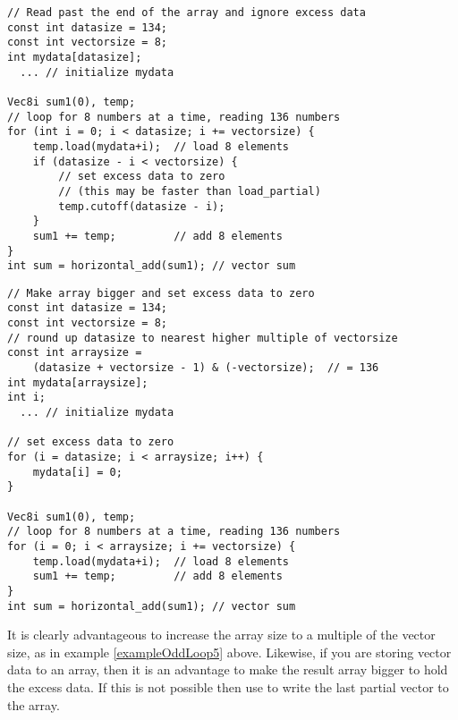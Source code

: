 \documentclass[vcl_manual.tex]{subfiles}
\begin{document}
\begin{example}
\label{exampleOddLoop4}
\end{example}
\begin{lstlisting}[frame=single]
// Read past the end of the array and ignore excess data
const int datasize = 134;
const int vectorsize = 8;
int mydata[datasize];
  ... // initialize mydata

Vec8i sum1(0), temp;
// loop for 8 numbers at a time, reading 136 numbers
for (int i = 0; i < datasize; i += vectorsize) {
    temp.load(mydata+i);  // load 8 elements
    if (datasize - i < vectorsize) {
        // set excess data to zero
        // (this may be faster than load_partial)
        temp.cutoff(datasize - i);
    }
    sum1 += temp;         // add 8 elements
}
int sum = horizontal_add(sum1); // vector sum
\end{lstlisting}


\begin{example}
\label{exampleOddLoop5}
\end{example}
\begin{lstlisting}[frame=single]
// Make array bigger and set excess data to zero
const int datasize = 134;
const int vectorsize = 8;
// round up datasize to nearest higher multiple of vectorsize
const int arraysize = 
    (datasize + vectorsize - 1) & (-vectorsize);  // = 136
int mydata[arraysize];
int i;
  ... // initialize mydata

// set excess data to zero
for (i = datasize; i < arraysize; i++) {
    mydata[i] = 0;
}

Vec8i sum1(0), temp;
// loop for 8 numbers at a time, reading 136 numbers
for (i = 0; i < arraysize; i += vectorsize) {
    temp.load(mydata+i);  // load 8 elements
    sum1 += temp;         // add 8 elements
}
int sum = horizontal_add(sum1); // vector sum
\end{lstlisting}


It is clearly advantageous to increase the array size to a multiple of the vector size, as in example \ref{exampleOddLoop5} above. Likewise, if you are storing vector data to an array, then it is an advantage to make the result array bigger to hold the excess data. If this is not possible then use  to write the last partial vector to the array.
\end{document}
